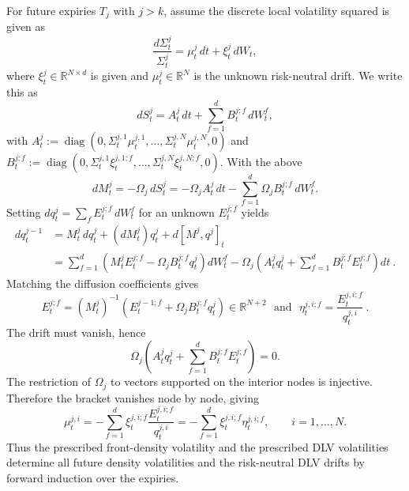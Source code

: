 \documentclass[11pt]{article}
\theoremstyle{plain}
\theoremstyle{definition}
\theoremstyle{remark}
\begin{document}
      For future expiries $T_j$ with $j>k$, assume the discrete local volatility squared is given as
      \begin{equation}
        \label{eq:dlv_sde_hb}
        \frac{ d\Sigma_t^{j} }{ \Sigma_t^{j} }
          = \mu^j_t\,dt
          + \xi^j_t\,dW_t,
      \end{equation}
      where $\xi_t^j\in\mathbb R^{N\times d}$ is given and
      $\mu_t^j\in\mathbb R^N$ is the unknown risk-neutral drift. We write this as
      \[
        dS_t^j=A_t^j\,dt+\sum_{f=1}^dB_t^{j;f}\,dW_t^f,
      \]
      with
        $A_t^j
        :=\operatorname{diag}(0,\Sigma_t^{j,1}\mu_t^{j,1},\ldots,
            \Sigma_t^{j,N}\mu_t^{j,N},0)$ and $B_t^{j;f}
        :=\operatorname{diag}(0,\Sigma_t^{j,1}\xi_t^{j,1;f},\ldots,
            \Sigma_t^{j,N}\xi_t^{j,N;f},0).$
      With the above
      \[
        dM_t^j=-\Omega_j\,dS_t^j
        =-\Omega_jA_t^j\,dt
        -\sum_{f=1}^d\Omega_jB_t^{j;f}\,dW_t^f.
      \]
      Setting $dq_t^j=\sum_fE_t^{j;f}\,dW_t^f$ for an unknown $E_t^{j;f}$ yields
      \begin{align}
        dq_t^{j-1}
        &= M_t^j\,dq_t^j+(dM_t^j)q_t^j+d[M^j,q^j]_t\\
        &= \sum_{f=1}^d
          \left(M_t^jE_t^{j;f}-\Omega_jB_t^{j;f}q_t^j\right)dW_t^f
          -\Omega_j\left(A_t^jq_t^j
          +\sum_{f=1}^dB_t^{j;f}E_t^{j;f}\right)dt \ .
      \end{align}
      Matching the diffusion coefficients gives
      \begin{equation}
        \label{eq:vol_hb}
        E_t^{j;f}
        =(M_t^j)^{-1}
          \left(E_t^{j-1;f}+\Omega_jB_t^{j;f}q_t^j\right)
        \in\mathbb R^{N+2} \ \ \ \mbox{and} \ \ \ \eta_t^{j,i;f}=\frac{ E_t^{j,i;f} }{ q_t^{j,i} } \ .
      \end{equation}
      The drift must vanish, hence
      \[
        \Omega_j\left(A_t^jq_t^j
        +\sum_{f=1}^dB_t^{j;f}E_t^{j;f}\right)=0.
      \]
      The restriction of $\Omega_j$ to vectors supported on the interior nodes
      is injective. Therefore the bracket vanishes node by node, giving
      \begin{equation}
        \label{eq:drift_hb}
        \mu_t^{j,i}
        =-\sum_{f=1}^d\xi_t^{j,i;f}
          \frac{E_t^{j,i;f}}{q_t^{j,i}}
        =-\sum_{f=1}^d\xi_t^{j,i;f}\eta_t^{j,i;f},
        \qquad i=1,\ldots,N.
      \end{equation}
      Thus the prescribed front-density volatility and the prescribed DLV
      volatilities determine all future density volatilities and the
      risk-neutral DLV drifts by forward induction over the expiries.
\end{document}
